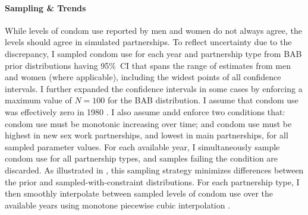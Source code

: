 \paragraph{Sampling \& Trends}
While levels of condom use reported by men and women do not always agree,
the levels should agree in simulated partnerships.
To reflect uncertainty due to the discrepancy,
I sampled condom use for each year and partnership type
from BAB prior distributions having 95\%~CI
that spans the range of estimates from men and women (where applicable),
including the widest points of all confidence intervals.
I further expanded the confidence intervals in some cases
by enforcing a maximum value of $N = 100$ for the BAB distribution.
I assume that condom use was effectively zero in 1980 \cite{SFHS1988}.
I also assume andd enforce two conditions that:
condom use must be monotonic increasing over time; and
condom use must be highest in new sex work partnerships, and lowest in main partnerships,
for all sampled parameter values.
For each available year, I simultaneously sample condom use for all partnership types,
and samples failing the condition are discarded.
As illustrated in , this sampling strategy
minimizes differences between the prior and sampled-with-constraint distributions.
For each partnership type, I then smoothly interpolate
between sampled levels of condom use over the available years
using monotone piecewise cubic interpolation \cite{Fritsch1980}.
